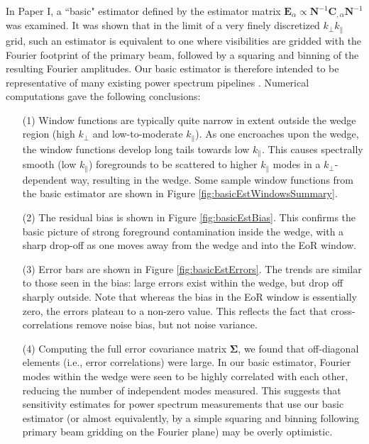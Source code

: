 \documentclass[twocolumn,aps,prd,nofootinbib,showpacs]{revtex4-1}
\begin{document}
In Paper I, a ``basic" estimator defined by the estimator matrix $\mathbf{E}_\alpha \propto \mathbf{N}^{-1} \mathbf{C}_{,\alpha} \mathbf{N}^{-1}$ was examined.  It was shown that in the limit of a very finely discretized $k_\perp k_\parallel$ grid, such an estimator is equivalent to one where visibilities are gridded with the Fourier footprint of the primary beam, followed by a squaring and binning of the resulting Fourier amplitudes.  Our basic estimator is therefore intended to be representative of many existing power spectrum pipelines \cite{Bernardi2013,Thyagarajan2013,Hazelton2013}.  Numerical computations gave the following conclusions:
\begin{enumerate}
\item[(1)] Window functions are typically quite narrow in extent outside the wedge region (high $k_\perp$ and low-to-moderate $k_\parallel$).  As one encroaches upon the wedge, the window functions develop long tails towards low $k_\parallel$.  This causes spectrally smooth (low $k_\parallel$) foregrounds to be scattered to higher $k_\parallel$ modes in a $k_\perp$-dependent way, resulting in the wedge.  Some sample window functions from the basic estimator are shown in Figure \ref{fig:basicEstWindowsSummary}.
\item[(2)] The residual bias is shown in Figure \ref{fig:basicEstBias}.  This confirms the basic picture of strong foreground contamination inside the wedge, with a sharp drop-off as one moves away from the wedge and into the EoR window.
\item[(3)] Error bars are shown in Figure \ref{fig:basicEstErrors}.  The trends are similar to those seen in the bias: large errors exist within the wedge, but drop off sharply outside.  Note that whereas the bias in the EoR window is essentially zero, the errors plateau to a non-zero value.  This reflects the fact that cross-correlations remove noise bias, but not noise variance.
\item[(4)] Computing the full error covariance matrix $\boldsymbol \Sigma$, we found that off-diagonal elements (i.e., error correlations) were large.  In our basic estimator, Fourier modes within the wedge were seen to be highly correlated with each other, reducing the number of independent modes measured.  This suggests that sensitivity estimates for power spectrum measurements that use our basic estimator (or almost equivalently, by a simple squaring and binning following primary beam gridding on the Fourier plane) may be overly optimistic.
\end{enumerate}
\end{document}
